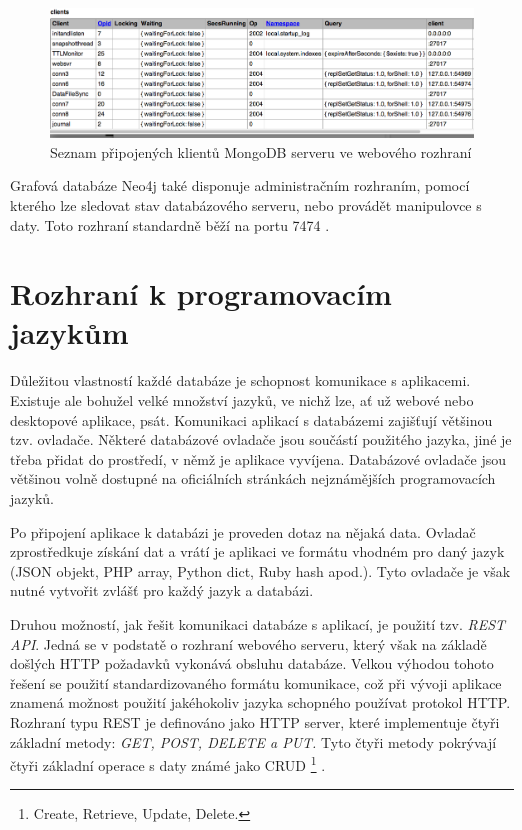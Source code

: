 \begin{figure}[h]
\begin{centering}
\includegraphics[scale=0.3]{obrazky/mongo-admin-clients}
\par\end{centering}
\caption{Seznam připojených klientů MongoDB serveru ve webového rozhraní\label{fig:mongoAdmin}}
\end{figure}

\FloatBarrier
Grafová databáze Neo4j také disponuje administračním rozhraním, pomocí kterého lze sledovat stav databázového serveru, nebo provádět manipulovce s daty. Toto rozhraní standardně běží na portu 7474  \cite{neo4j}.

\section{Rozhraní k programovacím jazykům}
Důležitou vlastností každé databáze je schopnost komunikace s aplikacemi. Existuje ale bohužel velké množství jazyků, ve nichž lze,  ať už webové nebo desktopové aplikace, psát. Komunikaci aplikací s databázemi zajišťují většinou tzv. ovladače. Některé databázové ovladače jsou součástí použitého jazyka, jiné je třeba přidat do prostředí, v němž je aplikace vyvíjena. Databázové ovladače jsou většinou volně dostupné na oficiálních stránkách nejznámějších programovacích jazyků.

Po připojení aplikace k databázi je proveden dotaz na nějaká data. Ovladač zprostředkuje získání dat a vrátí je aplikaci ve formátu vhodném pro daný jazyk (JSON objekt, PHP array, Python dict, Ruby hash apod.). Tyto ovladače je však nutné vytvořit zvlášť pro každý jazyk a databázi. 

Druhou možností, jak řešit komunikaci databáze s aplikací, je použití tzv. \emph{REST API}. Jedná se v podstatě o rozhraní webového serveru, který však na základě došlých HTTP požadavků vykonává obsluhu databáze. Velkou výhodou tohoto řešení se použití standardizovaného formátu komunikace, což při vývoji aplikace znamená možnost použití jakéhokoliv jazyka schopného používat protokol HTTP. Rozhraní typu REST je definováno jako HTTP server, které implementuje čtyři základní metody: \emph{GET, POST, DELETE a PUT.} Tyto čtyři metody pokrývají čtyři základní operace s daty známé jako CRUD \footnote{Create, Retrieve, Update, Delete.} \cite{rest}.

